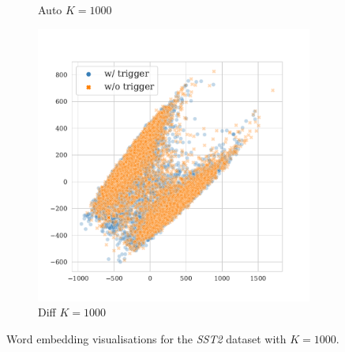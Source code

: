\begin{figure}[!ht]
\begin{subfigure}{.33\textwidth}
  \caption{Auto $K = 1000$}
  \label{fig:sst2_auto_k1000_embed}
\end{subfigure}%
\begin{subfigure}{.33\textwidth}
  \centering
  \includegraphics[width=\linewidth]{figures/evaluation_media/sst2-roberta-large-visual-backdoor-diff-prompt-k1000-seed42-poison-cf-1648.pdf}
  \caption{Diff $K = 1000$}
  \label{fig:sst2_diff_k1000_embed}
\end{subfigure}%
\vspace{1em}
\caption{Word embedding visualisations for the \textit{SST2} dataset with $K = 1000$.}
\label{fig:visualise_1000}
\end{figure}

